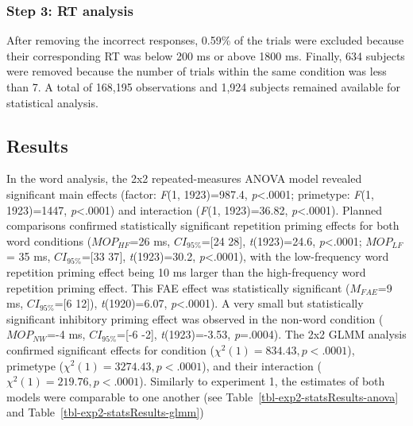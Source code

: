 \documentclass[
]{interact}
\begin{document}
\subsubsection{Step 3: RT analysis}\label{sec-exp2-analysis-RT}

After removing the incorrect responses, 0.59\% of the trials were
excluded because their corresponding RT was below 200 ms or above 1800
ms. Finally, 634 subjects were removed because the number of trials
within the same condition was less than 7. A total of 168,195
observations and 1,924 subjects remained available for statistical
analysis.

\subsection{Results}\label{sec-exp2-results}

In the word analysis, the 2x2 repeated-measures ANOVA model revealed
significant main effects (factor: \emph{F}(1, 1923)=987.4,
\emph{p}\textless.0001; primetype: \emph{F}(1, 1923)=1447,
\emph{p}\textless.0001) and interaction (\emph{F}(1, 1923)=36.82,
\emph{p}\textless.0001). Planned comparisons confirmed statistically
significant repetition priming effects for both word conditions
(\(MOP_{HF}\)=26 ms, \(CI_{95\%}\)={[}24 28{]}, \emph{t}(1923)=24.6,
\emph{p}\textless.0001; \(MOP_{LF}\) = 35 ms, \(CI_{95\%}\)={[}33 37{]},
\emph{t}(1923)=30.2, \emph{p}\textless.0001), with the low-frequency
word repetition priming effect being 10 ms larger than the
high-frequency word repetition priming effect. This FAE effect was
statistically significant (\(M_{FAE}\)=9 ms, \(CI_{95\%}\)={[}6 12{]}),
\emph{t}(1920)=6.07, \emph{p}\textless.0001). A very small but
statistically significant inhibitory priming effect was observed in the
non-word condition (\(MOP_{NW}\)=-4 ms, \(CI_{95\%}\)={[}-6 -2{]},
\emph{t}(1923)=-3.53, \emph{p}=.0004). The 2x2 GLMM analysis confirmed
significant effects for condition (\(\chi^2(1)=834.43, p<.0001\)),
primetype (\(\chi^2(1)=3274.43, p<.0001\)), and their interaction
(\(\chi^2(1)=219.76, p<.0001\)). Similarly to experiment 1, the
estimates of both models were comparable to one another (see
Table~\ref{tbl-exp2-statsResults-anova} and
Table~\ref{tbl-exp2-statsResults-glmm})
\end{document}
